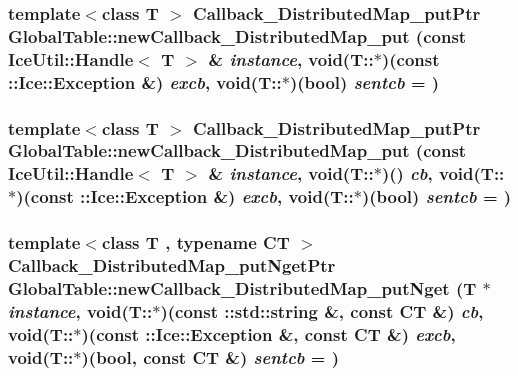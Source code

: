 \label{namespace_global_table_a1b1c1f4989bc137512559b0b2e6fb98f}
\hypertarget{namespace_global_table_a24d62f9bbaccde753ee29078e432876e}{
\subsubsection[{newCallback\_\-DistributedMap\_\-put}]{\setlength{\rightskip}{0pt plus 5cm}template$<$class T $>$ {\bf Callback\_\-DistributedMap\_\-putPtr} GlobalTable::newCallback\_\-DistributedMap\_\-put (const IceUtil::Handle$<$ T $>$ \& {\em instance}, \/  void(T::$\ast$)(const ::Ice::Exception \&) {\em excb}, \/  void(T::$\ast$)(bool) {\em sentcb} = {})}}
\label{namespace_global_table_a24d62f9bbaccde753ee29078e432876e}
\hypertarget{namespace_global_table_a8e87d3200f072b263e1b9e06ee82cb6c}{
\subsubsection[{newCallback\_\-DistributedMap\_\-put}]{\setlength{\rightskip}{0pt plus 5cm}template$<$class T $>$ {\bf Callback\_\-DistributedMap\_\-putPtr} GlobalTable::newCallback\_\-DistributedMap\_\-put (const IceUtil::Handle$<$ T $>$ \& {\em instance}, \/  void(T::$\ast$)() {\em cb}, \/  void(T::$\ast$)(const ::Ice::Exception \&) {\em excb}, \/  void(T::$\ast$)(bool) {\em sentcb} = {})}}
\label{namespace_global_table_a8e87d3200f072b263e1b9e06ee82cb6c}
\hypertarget{namespace_global_table_a9ee2209df3a2184964034042fd6f1ecb}{
\subsubsection[{newCallback\_\-DistributedMap\_\-putNget}]{\setlength{\rightskip}{0pt plus 5cm}template$<$class T , typename CT $>$ {\bf Callback\_\-DistributedMap\_\-putNgetPtr} GlobalTable::newCallback\_\-DistributedMap\_\-putNget (T $\ast$ {\em instance}, \/  void(T::$\ast$)(const ::std::string \&, const CT \&) {\em cb}, \/  void(T::$\ast$)(const ::Ice::Exception \&, const CT \&) {\em excb}, \/  void(T::$\ast$)(bool, const CT \&) {\em sentcb} = {})}}
